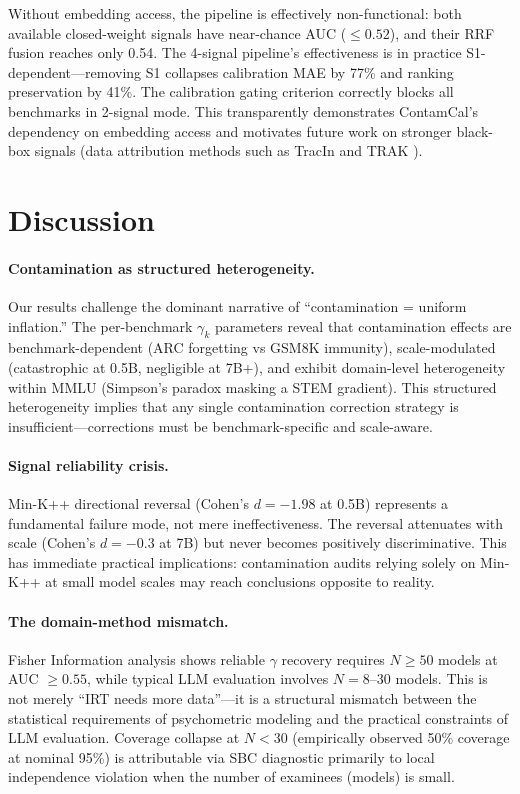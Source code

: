 \documentclass[11pt]{article}
\begin{document}
Without embedding access, the pipeline is effectively non-functional: both available closed-weight signals have near-chance AUC ($\leq 0.52$), and their RRF fusion reaches only 0.54. The 4-signal pipeline's effectiveness is in practice S1-dependent---removing S1 collapses calibration MAE by 77\% and ranking preservation by 41\%. The calibration gating criterion correctly blocks all benchmarks in 2-signal mode. This transparently demonstrates ContamCal's dependency on embedding access and motivates future work on stronger black-box signals (data attribution methods such as TracIn \citep{pruthi2020estimating} and TRAK \citep{park2023trak}).

\section{Discussion}

\paragraph{Contamination as structured heterogeneity.} Our results challenge the dominant narrative of ``contamination = uniform inflation.'' The per-benchmark $\gamma_k$ parameters reveal that contamination effects are benchmark-dependent (ARC forgetting vs GSM8K immunity), scale-modulated (catastrophic at 0.5B, negligible at 7B+), and exhibit domain-level heterogeneity within MMLU (Simpson's paradox masking a STEM gradient). This structured heterogeneity implies that any single contamination correction strategy is insufficient---corrections must be benchmark-specific and scale-aware.

\paragraph{Signal reliability crisis.} Min-K++ directional reversal (Cohen's $d = -1.98$ at 0.5B) represents a fundamental failure mode, not mere ineffectiveness. The reversal attenuates with scale (Cohen's $d = -0.3$ at 7B) but never becomes positively discriminative. This has immediate practical implications: contamination audits relying solely on Min-K++ at small model scales may reach conclusions opposite to reality.

\paragraph{The domain-method mismatch.} Fisher Information analysis shows reliable $\gamma$ recovery requires $N \geq 50$ models at AUC $\geq 0.55$, while typical LLM evaluation involves $N = 8$--$30$ models. This is not merely ``IRT needs more data''---it is a structural mismatch between the statistical requirements of psychometric modeling and the practical constraints of LLM evaluation. Coverage collapse at $N < 30$ (empirically observed 50\% coverage at nominal 95\%) is attributable via SBC diagnostic primarily to local independence violation when the number of examinees (models) is small.
\end{document}
